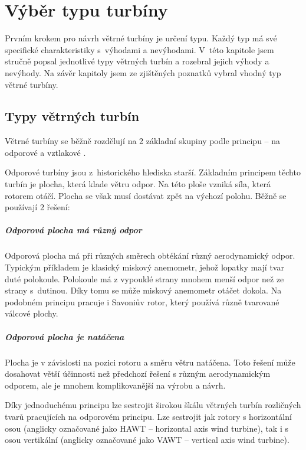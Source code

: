 \chapter{Výběr typu turbíny}
	Prvním krokem pro návrh větrné turbíny je určení typu. Každý typ má své specifické charakteristiky s~výhodami a nevýhodami. V~této kapitole jsem stručně popsal jednotlivé typy větrných turbín a rozebral jejich výhody a nevýhody. Na závěr kapitoly jsem ze zjištěných poznatků vybral vhodný typ větrné turbíny.	
	\section{Typy větrných turbín}\label{sec:typy_turbin}
		Větrné turbíny se běžně rozdělují na 2 základní skupiny podle principu – na odporové a vztlakové \cite{Rychetnik:Motory}.
		
		Odporové turbíny jsou z~historického hlediska starší. Základním principem těchto turbín je plocha, která klade větru odpor. Na této ploše vzniká síla, která rotorem otáčí. Plocha se však musí dostávat zpět na výchozí polohu. Běžně se používají 2 řešení\cite{Rychetnik:Motory}:
		
		\paragraph{Odporová plocha má různý odpor}
			Odporová plocha má při různých směrech obtékání různý aerodynamický odpor. Typickým příkladem je klasický miskový anemometr, jehož lopatky mají tvar duté polokoule. Polokoule má z vypouklé strany mnohem menší odpor než ze strany s~dutinou. Díky tomu se může miskový anemometr otáčet dokola. Na podobném principu pracuje i Savoniův rotor, který používá různě tvarované válcové plochy.
		\paragraph{Odporová plocha je natáčena}
			Plocha je v závislosti na pozici rotoru a směru větru natáčena. Toto řešení může dosahovat větší účinnosti než předchozí řešení s různým aerodynamickým odporem, ale je mnohem komplikovanější na výrobu a návrh.
			
		\bigskip	
		Díky jednoduchému principu lze sestrojit širokou škálu větrných turbín rozličných tvarů pracujících na odporovém principu. Lze sestrojit jak rotory s horizontální osou (anglicky označované jako HAWT – horizontal axis wind turbine), tak i s osou vertikální (anglicky označované jako VAWT – vertical axis wind turbine)\cite{ve:ve}.
		

